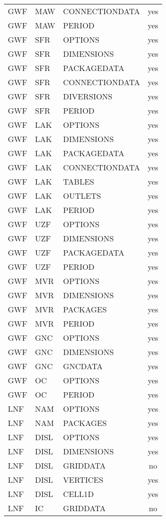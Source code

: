 \begin{longtable}{p{1.5cm} p{1.5cm} p{3cm} c}
GWF & MAW & CONNECTIONDATA & yes \\ 
GWF & MAW & PERIOD & yes \\ 
\hline
GWF & SFR & OPTIONS & yes \\ 
GWF & SFR & DIMENSIONS & yes \\ 
GWF & SFR & PACKAGEDATA & yes \\ 
GWF & SFR & CONNECTIONDATA & yes \\ 
GWF & SFR & DIVERSIONS & yes \\ 
GWF & SFR & PERIOD & yes \\ 
\hline
GWF & LAK & OPTIONS & yes \\ 
GWF & LAK & DIMENSIONS & yes \\ 
GWF & LAK & PACKAGEDATA & yes \\ 
GWF & LAK & CONNECTIONDATA & yes \\ 
GWF & LAK & TABLES & yes \\ 
GWF & LAK & OUTLETS & yes \\ 
GWF & LAK & PERIOD & yes \\ 
\hline
GWF & UZF & OPTIONS & yes \\ 
GWF & UZF & DIMENSIONS & yes \\ 
GWF & UZF & PACKAGEDATA & yes \\ 
GWF & UZF & PERIOD & yes \\ 
\hline
GWF & MVR & OPTIONS & yes \\ 
GWF & MVR & DIMENSIONS & yes \\ 
GWF & MVR & PACKAGES & yes \\ 
GWF & MVR & PERIOD & yes \\ 
\hline
GWF & GNC & OPTIONS & yes \\ 
GWF & GNC & DIMENSIONS & yes \\ 
GWF & GNC & GNCDATA & yes \\ 
\hline
GWF & OC & OPTIONS & yes \\ 
GWF & OC & PERIOD & yes \\ 
\hline
LNF & NAM & OPTIONS & yes \\ 
LNF & NAM & PACKAGES & yes \\ 
\hline
LNF & DISL & OPTIONS & yes \\ 
LNF & DISL & DIMENSIONS & yes \\ 
LNF & DISL & GRIDDATA & no \\ 
LNF & DISL & VERTICES & yes \\ 
LNF & DISL & CELL1D & yes \\ 
\hline
LNF & IC & GRIDDATA & no \\ 

\end{longtable}

